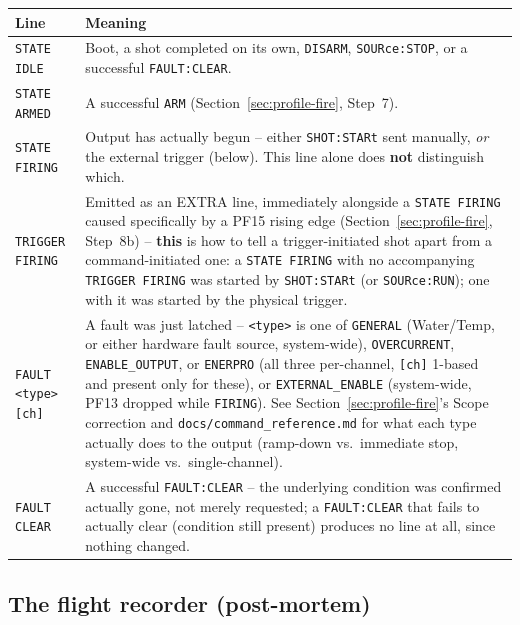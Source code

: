 \documentclass[11pt]{article}
\newcommand{\code}[1]{\texttt{#1}}
\begin{document}
\begin{center}
\begin{tabular}{p{2in} p{2.7in}}
  \hline
  \textbf{Line} & \textbf{Meaning} \\
  \hline
  \code{STATE IDLE} &
    Boot, a shot completed on its own, \code{DISARM}, \code{SOURce:STOP},
    or a successful \code{FAULT:CLEAR}. \\
  \code{STATE ARMED} &
    A successful \code{ARM} (Section~\ref{sec:profile-fire}, Step~7). \\
  \code{STATE FIRING} &
    Output has actually begun -- either \code{SHOT:STARt} sent
    manually, \emph{or} the external trigger (below). This line alone
    does \textbf{not} distinguish which. \\
  \code{TRIGGER FIRING} &
    Emitted as an EXTRA line, immediately alongside a \code{STATE
    FIRING} caused specifically by a PF15 rising edge
    (Section~\ref{sec:profile-fire}, Step~8b) -- \textbf{this} is how to
    tell a trigger-initiated shot apart from a command-initiated one: a
    \code{STATE FIRING} with no accompanying \code{TRIGGER FIRING} was
    started by \code{SHOT:STARt} (or \code{SOURce:RUN}); one
    with it was started by the physical trigger. \\
  \code{FAULT <type> [ch]} &
    A fault was just latched -- \code{<type>} is one of \code{GENERAL}
    (Water/Temp, or either hardware fault source, system-wide),
    \code{OVERCURRENT}, \code{ENABLE\_OUTPUT}, or \code{ENERPRO} (all
    three per-channel, \code{[ch]} 1-based and present only for these),
    or \code{EXTERNAL\_ENABLE} (system-wide, PF13 dropped while
    \code{FIRING}). See Section~\ref{sec:profile-fire}'s Scope
    correction and \code{docs/command\_reference.md} for what each type
    actually does to the output (ramp-down vs.\ immediate stop,
    system-wide vs.\ single-channel). \\
  \code{FAULT CLEAR} &
    A successful \code{FAULT:CLEAR} -- the underlying condition was
    confirmed actually gone, not merely requested; a \code{FAULT:CLEAR}
    that fails to actually clear (condition still present) produces no
    line at all, since nothing changed. \\
  \hline
\end{tabular}
\end{center}

\subsection{The flight recorder (post-mortem)}
\end{document}
